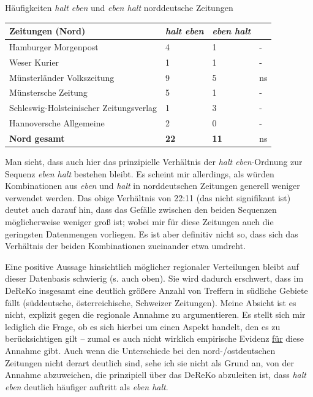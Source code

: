 \begin{exe}
	\ex\label{622}Häufigkeiten \textit{halt eben} und \textit{eben halt} norddeutsche Zeitungen\\[-0.6em]
	\scriptsize
     \begin{tabular}[t]{|l|l|l|l|}
     \hline
	 \textbf{Zeitungen (Nord)} & \textit{halt eben} & \textit{eben halt} & {} \\
	 \hline
	 Hamburger Morgenpost & 4 & 1 & -\\
	 \hline
	 Weser Kurier & 1 & 1 & -\\
	 \hline
	 Münsterländer Volkszeitung & 9 & 5 & ns\\
	 \hline
	 Münstersche Zeitung & 5 & 1 & -\\
	 \hline
	 Schleswig-Holsteinischer Zeitungsverlag & 1 & 3 & -\\
	 \hline
	 Hannoversche Allgemeine & 2 & 0 & -\\
	 \hline 
	 \textbf{Nord gesamt} & \textbf{22} & \textbf{11} & ns\\
	 \hline
     \end{tabular}
\end{exe}
Man sieht, dass auch hier das prinzipielle Verhältnis der \textit{halt eben}-Ordnung zur Sequenz \textit{eben halt} bestehen bleibt. Es scheint mir allerdings, als würden Kombinationen aus \textit{eben} und \textit{halt} in norddeutschen Zeitungen generell weniger verwendet werden. Das obige Verhältnis von 22:11 (das nicht signifikant ist) deutet auch darauf hin, dass das Gefälle zwischen den beiden Sequenzen möglicherweise weniger groß ist; wobei mir für diese Zeitungen auch die geringsten Datenmengen vorliegen. Es ist aber definitiv nicht so, dass sich das Verhältnis der beiden Kombinationen zueinander etwa umdreht.

Eine positive Aussage hinsichtlich möglicher regionaler Verteilungen bleibt auf dieser Datenbasis schwierig (s. auch oben). Sie wird dadurch erschwert, dass im DeReKo insgesamt eine deutlich größere Anzahl von Treffern in südliche Gebiete fällt (süddeutsche, österreichische, Schweizer Zeitungen). Meine Absicht ist es nicht, explizit gegen die regionale Annahme zu argumentieren. Es stellt sich mir lediglich die Frage, ob es sich hierbei um einen Aspekt handelt, den es zu berücksichtigen gilt – zumal es auch nicht wirklich empirische Evidenz \underline{für} diese Annahme gibt. Auch wenn die Unterschiede bei den nord-/ostdeutschen Zeitungen nicht derart deutlich sind, sehe ich sie nicht als Grund an, von der Annahme abzuweichen, die prinzipiell über das DeReKo abzuleiten ist, dass \textit{halt eben} deutlich häufiger auftritt als \textit{eben halt}.

